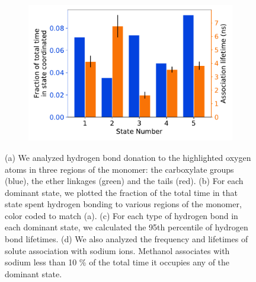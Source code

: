 \documentclass[journal=jpcbfk,manuscript=article]{achemso}
\begin{document}
\begin{figure}
\begin{subfigure}{0.475\textwidth}
  \caption{}\label{fig:hbond_lifetimes}
  \end{subfigure}
  \begin{subfigure}{0.475\textwidth}
  \includegraphics[width=\textwidth]{association_fraction_lifetimes.pdf}
  \caption{}\label{fig:association_fraction_lifetimes}
  \end{subfigure}
  \caption{(a) We analyzed hydrogen bond donation to the highlighted oxygen atoms in three 
  regions of the monomer: the carboxylate groups (blue), the ether linkages (green) and the
  tails (red). (b) For each dominant state, we plotted the fraction of the total time in
  that state spent hydrogen bonding to various regions of the monomer, color coded to match (a).
  (c) For each type of hydrogen bond in each dominant state, we calculated the 95th percentile
  of hydrogen bond lifetimes. (d) We also analyzed the frequency and lifetimes of solute 
  association with sodium ions. Methanol associates with sodium less than 10 \% of the total 
  time it occupies any of the dominant state.
  }
  \label{fig:hydrogen_bonding}
  \end{figure}
  
\end{document}
